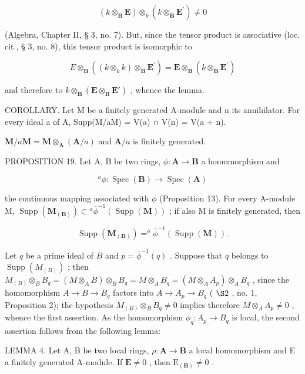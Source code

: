 \[
(k \otimes_ {\mathbf {B}} \mathbf {E}) \otimes_ {k} (k \otimes_ {\mathbf {B}} \mathbf {E} ^ {\prime}) \neq 0
\]

(Algebra, Chapter II, § 3, no. 7). But, since the tensor product is associative (loc. cit., § 3, no. 8), this tensor product is isomorphic to

\[
E \otimes_ {\mathbf {B}} ((k \otimes_ {k} k) \otimes_ {\mathbf {B}} \mathbf {E} ^ {\prime}) = \mathbf {E} \otimes_ {\mathbf {B}} (k \otimes_ {\mathbf {B}} \mathbf {E} ^ {\prime})
\]

and therefore to \(k \otimes_{\mathbf{B}} (\mathbf{E} \otimes_{\mathbf{B}} \mathbf{E}')\) , whence the lemma.

COROLLARY. Let M be a finitely generated A-module and n its annihilator. For every ideal a of A, Supp(M/aM) = V(a) ∩ V(n) = V(a + n).

\(\mathbf{M} / a\mathbf{M} = \mathbf{M}\otimes_{\mathbf{A}}(\mathbf{A} / a)\) and \(\mathbf{A} / a\) is finitely generated.

PROPOSITION 19. Let A, B be two rings, \(\phi: \mathbf{A} \to \mathbf{B}\) a homomorphism and

\[
^ {a} \phi : \operatorname{Spec} (\mathbf {B}) \rightarrow \operatorname{Spec} (\mathbf {A})
\]

the continuous mapping associated with \(\phi\) (Proposition 13). For every A-module M, \(\operatorname{Supp}(\mathbf{M}_{(\mathbf{B})}) \subset {}^a\overline{\phi}^{-1}(\operatorname{Supp}(\mathbf{M}))\) ; if also M is finitely generated, then

\[
\operatorname{Supp} (\mathbf {M} _ {(\mathbf {B})}) = ^ {a} \bar {\phi} ^ {- 1} (\operatorname{Supp} (\mathbf {M})).
\]

Let \(q\) be a prime ideal of \(B\) and \(p = \overline{\phi}^{-1}(q)\) . Suppose that \(q\) belongs to \(\operatorname{Supp}(M_{(B)})\) ; then \(M_{(B)} \otimes_B B_q = (M \otimes_A B) \otimes_B B_q = M \otimes_A B_q = (M \otimes_A A_p) \otimes_A B_q\) , since the homomorphism \(A \to B \to B_q\) factors into \(A \to A_p \to B_q\) ( \(\S 2\) , no. 1, Proposition 2); the hypothesis \(M_{(B)} \otimes_B B_q \neq 0\) implies therefore \(M \otimes_A A_p \neq 0\) , whence the first assertion. As the homomorphism \(\phi_q: A_p \to B_q\) is local, the second assertion follows from the following lemma:

LEMMA 4. Let A, B be two local rings, \(\rho: \mathbf{A} \to \mathbf{B}\) a local homomorphism and E a finitely generated A-module. If \(\mathbf{E} \neq 0\) , then \(\mathrm{E}_{(\mathbf{B})} \neq 0\) .


